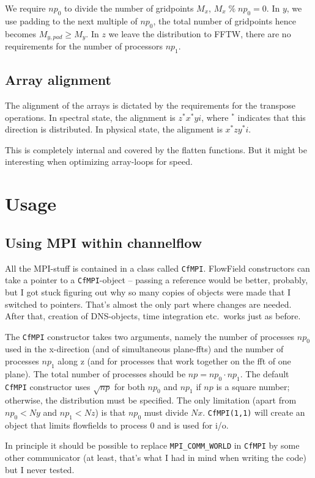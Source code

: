 \documentclass[a4paper,10pt,DIV=16]{scrartcl}
\begin{document}
		We require $np_0$ to divide the number of gridpoints $M_x$, $M_x\; \%\; np_0 = 0$.
		In $y$, we use padding to the next multiple of $np_0$, the total number of gridpoints hence becomes $M_{y,pad} \geq M_{y}$.
		In $z$ we leave the distribution to FFTW, there are no requirements for the number of processors $np_1$.
		
	\subsection{Array alignment}
		The alignment of the arrays is dictated by the requirements for the transpose operations.
		In spectral state, the alignment is $z^* x^* y i$, where $^*$ indicates that this direction is distributed.
		In physical state, the alignment is $x^* z y^* i$.
		
		This is completely internal and covered by the flatten functions. But it might be interesting when optimizing array-loops for speed.
		
\section{Usage}
	\subsection{Using MPI within channelflow}
		All the MPI-stuff is contained in a class called {\tt CfMPI}.
		FlowField constructors can take a pointer to a {\tt CfMPI}-object -- passing a reference would be better, probably, but I got stuck figuring out why so many copies of objects were made that I switched to pointers.
		That's almost the only part where changes are needed. After that, creation of DNS-objects, time integration etc.\ works just as before.

		The {\tt CfMPI} constructor takes two arguments, namely the number of processes $np_0$ used in the x-direction (and of simultaneous plane-ffts) and the number of processes $np_1$ along z (and for processes that work together on the fft of one plane).
		The total number of processes should be $np = np_0 \cdot np_1$.
		The default {\tt CfMPI} constructor uses $\sqrt{np}$ for both $np_0$ and $np_1$ if $np$ is a square number; otherwise, the distribution must be specified.
		The only limitation (apart from $np_0 < Ny$ and $np_1 < Nz$) is that $np_0$ must divide $Nx$.
		{\tt CfMPI(1,1)} will create an object that limits flowfields to process $0$ and is used for i/o.


		In principle it should be possible to replace {\tt MPI\_COMM\_WORLD} in {\tt CfMPI} by some other communicator (at least, that's what I had in mind when writing the code) but I never tested.
\end{document}
